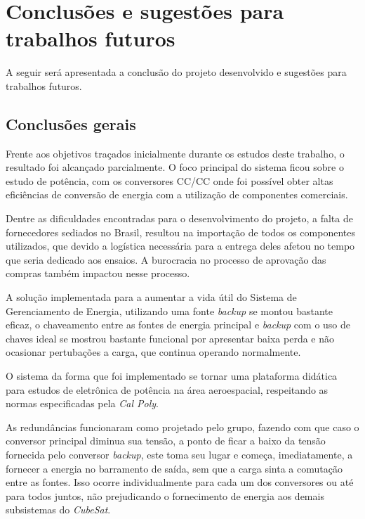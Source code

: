 \documentclass[
	12pt,				%
	openright,			%
	oneside,			%
	a4paper,			%
	english,			%
	french,				%
	spanish,			%
	brazil,				%
	oldfontcommands
	]{abntex2}
\begin{document}
	

\chapter[Conclusões e sugestões para trabalhos futuros]{Conclusões e sugestões para trabalhos futuros} \label{ultimo_capitulo}

	A seguir será apresentada a conclusão do projeto desenvolvido e sugestões para trabalhos futuros.
	
\section[Conclusões gerais]{Conclusões gerais}

	Frente aos objetivos traçados inicialmente durante os estudos deste trabalho, o resultado foi alcançado parcialmente. O foco principal do sistema ficou sobre o estudo de potência, com os conversores CC/CC onde foi possível obter altas eficiências de conversão de energia com a utilização de componentes comerciais.
	
	 Dentre as dificuldades encontradas para o desenvolvimento do projeto, a falta de fornecedores sediados no Brasil, resultou na importação de todos os componentes utilizados, que devido a logística necessária para a entrega deles afetou no tempo que seria dedicado aos ensaios. A burocracia no processo de aprovação das compras também impactou nesse processo.
	 
	 A solução implementada para a aumentar a vida útil do Sistema de Gerenciamento de Energia, utilizando uma fonte \textit{backup} se montou bastante eficaz, o chaveamento entre as fontes de energia principal e \textit{backup} com o uso de chaves ideal se mostrou bastante funcional por apresentar baixa perda e não ocasionar pertubações a carga, que continua operando normalmente. 
	
	O sistema da forma que foi implementado se tornar uma plataforma didática para estudos de eletrônica de potência na área aeroespacial, respeitando as normas especificadas pela \textit{Cal Poly}. 

	As redundâncias funcionaram como projetado pelo grupo, fazendo com que caso o conversor principal diminua sua tensão, a ponto de ficar a baixo da tensão fornecida pelo conversor \textit{backup}, este toma seu lugar e começa, imediatamente, a fornecer a energia no barramento de saída, sem que a carga sinta a comutação entre as fontes. Isso ocorre individualmente para cada um dos conversores ou até para todos juntos, não prejudicando o fornecimento de energia aos demais subsistemas do \textit{CubeSat}.
\end{document}
